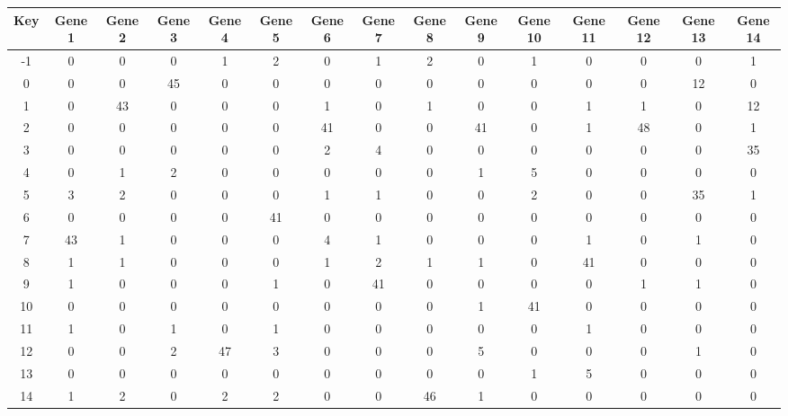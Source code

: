\begin{tabular}{|c|c|c|c|c|c|c|c|c|c|c|c|c|c|c|}
\hline
Key & Gene 1 & Gene 2 & Gene 3 & Gene 4 & Gene 5 & Gene 6 & Gene 7 & Gene 8 & Gene 9 & Gene 10 & Gene 11 & Gene 12 & Gene 13 & Gene 14 \\
\hline
-1 & 0 & 0 & 0 & 1 & 2 & 0 & 1 & 2 & 0 & 1 & 0 & 0 & 0 & 1 \\
0 & 0 & 0 & 45 & 0 & 0 & 0 & 0 & 0 & 0 & 0 & 0 & 0 & 12 & 0 \\
1 & 0 & 43 & 0 & 0 & 0 & 1 & 0 & 1 & 0 & 0 & 1 & 1 & 0 & 12 \\
2 & 0 & 0 & 0 & 0 & 0 & 41 & 0 & 0 & 41 & 0 & 1 & 48 & 0 & 1 \\
3 & 0 & 0 & 0 & 0 & 0 & 2 & 4 & 0 & 0 & 0 & 0 & 0 & 0 & 35 \\
4 & 0 & 1 & 2 & 0 & 0 & 0 & 0 & 0 & 1 & 5 & 0 & 0 & 0 & 0 \\
5 & 3 & 2 & 0 & 0 & 0 & 1 & 1 & 0 & 0 & 2 & 0 & 0 & 35 & 1 \\
6 & 0 & 0 & 0 & 0 & 41 & 0 & 0 & 0 & 0 & 0 & 0 & 0 & 0 & 0 \\
7 & 43 & 1 & 0 & 0 & 0 & 4 & 1 & 0 & 0 & 0 & 1 & 0 & 1 & 0 \\
8 & 1 & 1 & 0 & 0 & 0 & 1 & 2 & 1 & 1 & 0 & 41 & 0 & 0 & 0 \\
9 & 1 & 0 & 0 & 0 & 1 & 0 & 41 & 0 & 0 & 0 & 0 & 1 & 1 & 0 \\
10 & 0 & 0 & 0 & 0 & 0 & 0 & 0 & 0 & 1 & 41 & 0 & 0 & 0 & 0 \\
11 & 1 & 0 & 1 & 0 & 1 & 0 & 0 & 0 & 0 & 0 & 1 & 0 & 0 & 0 \\
12 & 0 & 0 & 2 & 47 & 3 & 0 & 0 & 0 & 5 & 0 & 0 & 0 & 1 & 0 \\
13 & 0 & 0 & 0 & 0 & 0 & 0 & 0 & 0 & 0 & 1 & 5 & 0 & 0 & 0 \\
14 & 1 & 2 & 0 & 2 & 2 & 0 & 0 & 46 & 1 & 0 & 0 & 0 & 0 & 0 \\
\hline
\end{tabular}